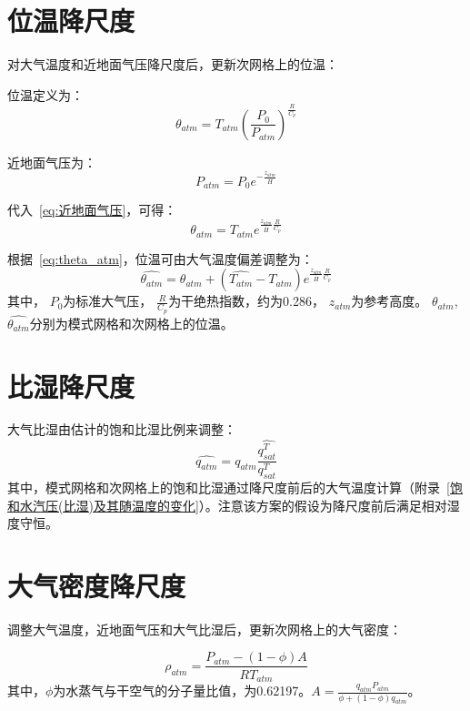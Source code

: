 \section{位温降尺度}
对大气温度和近地面气压降尺度后，更新次网格上的位温：

位温定义为：
\begin{equation}
\theta_{atm}=T_{atm} \left(\frac{P_0}{P_{atm}}\right)^\frac{R}{C_{p}}
\end{equation}

近地面气压为：
\begin{equation}\label{eq:近地面气压}
{P_{atm}}=P_{0} e^{-\frac{z_{atm}}{\bar{H}}}
\end{equation}

代入~\eqref{eq:近地面气压}，可得：
\begin{equation}\label{eq:theta_atm}
\theta_{atm}=T_{atm} e^{\frac{z_{atm}}{\bar{H}} \frac{R}{C_{p}}}
\end{equation}

根据~\eqref{eq:theta_atm}，位温可由大气温度偏差调整为：
\begin{equation}
\hat{\theta_{atm}}=\theta_{atm}+\left(\hat{T_{atm}}-T_{atm}\right) e^{\frac{z_{atm}}{\bar{H}} \frac{R}{C_{p}}}
\end{equation}
其中，
$P_{0}$为标准大气压，
$\frac{R}{C_{p}}$为干绝热指数，约为0.286，
$z_{atm}$为参考高度。
$\theta_{atm}$, $\hat{\theta_{atm}}$分别为模式网格和次网格上的位温。

\section{比湿降尺度}
大气比湿由估计的饱和比湿比例来调整：\\

\begin{equation}
\hat{q_{atm}}=q_{atm} \frac{\hat{q_{sat}^T}}{q_{sat}^T} 
\end{equation}
其中，模式网格和次网格上的饱和比湿通过降尺度前后的大气温度计算（附录~\ref{饱和水汽压(比湿)及其随温度的变化}）。注意该方案的假设为降尺度前后满足相对湿度守恒。

\section{大气密度降尺度}
调整大气温度，近地面气压和大气比湿后，更新次网格上的大气密度：

\begin{equation}
\rho_{atm}=\frac{P_{atm}-(1-\phi)A}{R T_{atm}}
\end{equation}
其中，$\phi$为水蒸气与干空气的分子量比值，为0.62197。$A=\frac{q_{atm} P_{atm}}{\phi +(1-\phi)q_{atm}}$。

